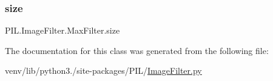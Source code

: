 \subsubsection{\texorpdfstring{size}{size}}
{\footnotesize\ttfamily P\+I\+L.\+Image\+Filter.\+Max\+Filter.\+size}



The documentation for this class was generated from the following file\+:\begin{DoxyCompactItemize}
\item 
venv/lib/python3./site-\/packages/\+P\+I\+L/\hyperlink{ImageFilter_8py}{Image\+Filter.\+py}\end{DoxyCompactItemize}
